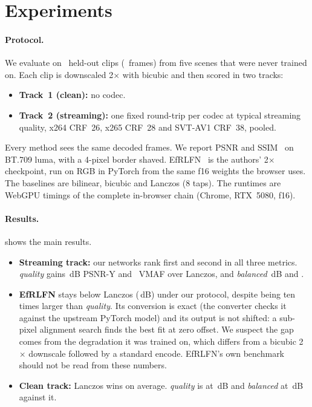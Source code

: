 \documentclass[10pt,twocolumn,letterpaper]{article}
\begin{document}
\section{Experiments}
\label{sec:exp}

\paragraph{Protocol.} We evaluate on \nClips\ held-out clips (\nFrames\ frames) from five scenes
that were never trained on. Each clip is downscaled 2$\times$ with bicubic and then scored in two
tracks:
\begin{itemize}
\setlength\itemsep{0pt}
\item \textbf{Track~1 (clean):} no codec.
\item \textbf{Track~2 (streaming):} one fixed round-trip per codec at typical streaming quality,
x264 CRF~26, x265 CRF~28 and SVT-AV1 CRF~38, pooled.
\end{itemize}
Every method sees the same decoded frames. We report PSNR and SSIM~\cite{ssim} on BT.709 luma,
with a 4-pixel border shaved. EfRLFN~\cite{efrlfn} is the authors' 2$\times$ checkpoint, run on RGB
in PyTorch from the same f16 weights the browser uses. The baselines are bilinear, bicubic and
Lanczos (8 taps). The runtimes are WebGPU timings of the complete in-browser chain (Chrome,
RTX~5080, f16).



\paragraph{Results.}  shows the main results.
\begin{itemize}
\setlength\itemsep{0pt}
\item \textbf{Streaming track:} our networks rank first and second in all three metrics.
\emph{quality} gains \gainQualStream\,dB PSNR-Y and \vmafQualStream\ VMAF over Lanczos, and
\emph{balanced} \gainBalStream\,dB and \vmafBalStream.
\item \textbf{EfRLFN} stays below Lanczos (\gainEfStream\,dB) under our protocol, despite being ten
times larger than \emph{quality}. Its conversion is exact (the converter checks it against the
upstream PyTorch model) and its output is not shifted: a sub-pixel alignment search finds the
best fit at zero offset. We suspect the gap comes from the degradation it was trained on, which differs
from a bicubic 2$\times$ downscale followed by a standard encode. EfRLFN's own benchmark should
not be read from these numbers.
\item \textbf{Clean track:} Lanczos wins on average. \emph{quality} is at \gainQualClean\,dB and
\emph{balanced} at \gainBalClean\,dB against it.
\end{itemize}
\end{document}
